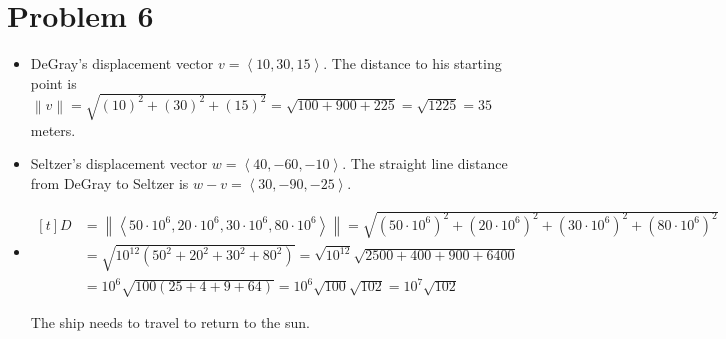 \documentclass{article}
\newcommand*{\problem}[1]{\section*{Problem #1}}
\begin{document}
\problem{6}
\begin{itemize}
	\item[(a)] DeGray's displacement vector $\boxed{v=\left< 10,30,15 \right>}$. The distance to his starting point is $\left\lVert v \right\rVert =\sqrt{(10)^2+(30)^2+(15)^2}=\sqrt{100+900+225}=\sqrt{1225}=35$ meters.

	\item[(b)] Seltzer's displacement vector $\boxed{w=\left< 40,-60,-10 \right>}$. The straight line distance from DeGray to Seltzer is $\boxed{w-v}=\left< 30,-90,-25 \right>$.
	
	\item[(c)]
		$\begin{aligned}[t]
			D
			&=\left\lVert \left< 50\cdot 10^6, 20\cdot 10^6, 30\cdot 10^6, 80\cdot 10^6 \right> \right\rVert
			=\sqrt{\left(50\cdot 10^6\right)^2+\left(20\cdot 10^6\right)^2+\left(30\cdot 10^6\right)^2+\left(80\cdot 10^6\right)^2} \\
			&=\sqrt{10^{12}\left( 50^2+20^2+30^2+80^2 \right)}
			=\sqrt{10^{12}}\sqrt{2500+400+900+6400} \\
			&=10^6 \sqrt{100 \left( 25+4+9+64 \right)}
			=10^6 \sqrt{100} \sqrt{102}
			=10^7 \sqrt{102}
		\end{aligned}$

		The ship needs to travel  to return to the sun.
\end{itemize}
\end{document}
